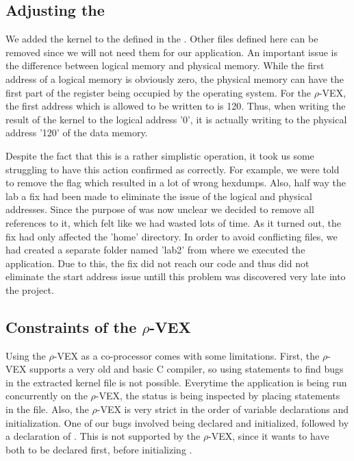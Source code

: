 \subsection{Adjusting the }
We added the kernel to the  defined in the . Other files defined here can be removed since we will not need them for our application. An important issue is the difference between logical memory and physical memory. While the first address of a logical memory is obviously zero, the physical memory can have the first part of the register being occupied by the operating system. For the $\rho$-VEX, the first address which is allowed to be written to is 120. Thus, when writing the result of the kernel to the logical address '0', it is  actually writing to the physical address '120' of the data memory. %

Despite the fact that this is a rather simplistic operation, it took us some struggling to have this action confirmed as correctly. For example, we were told to remove the  flag which resulted in a lot of wrong hexdumps. Also, half way the lab a fix had been made to eliminate the issue of the logical and physical addresses. Since the purpose of  was now unclear we decided to remove all references to it, which felt like we had wasted lots of time. As it turned out, the fix had only affected the 'home' directory. In order to avoid conflicting files, we had created a separate folder named 'lab2' from where we executed the application. Due to this, the fix did not reach our code and thus did not eliminate the start address issue untill this problem was discovered very late into the project.

\subsection{Constraints of the $\rho$-VEX}
Using the $\rho$-VEX as a co-processor comes with some limitations. First, the $\rho$-VEX supports a very old and basic C compiler, so using  statements to find bugs in the extracted kernel file is not possible. Everytime the application is being run concurrently on the $\rho$-VEX, the status is being inspected by placing  statements in the  file. Also, the $\rho$-VEX is very strict in the order of variable declarations and initialization. One of our bugs involved  being declared and initialized, followed by a declaration of . This is not supported by the $\rho$-VEX, since it wants to have  both to be declared first, before initializing .

